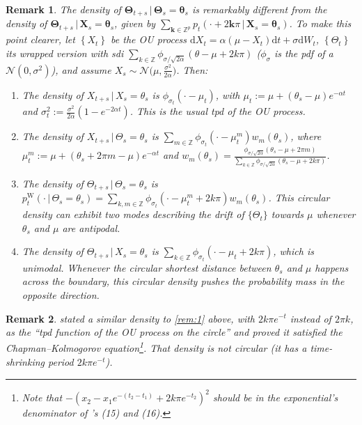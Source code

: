 \documentclass[oneside,11pt]{article}
\newcommand{\Z}{\mathbb{Z}}
\newcommand{\rd}{\mathrm{d}}
\newcommand{\bX}{\mathbf{X}}
\newcommand{\bk}{\mathbf{k}}
\newcommand{\btheta}{\boldsymbol\theta}
\newcommand{\bTheta}{\boldsymbol\Theta}
\newcommand{\lrp}[1]{\left(#1\right)}
\newcommand{\lrb}[1]{\left\{#1\right\}}
\newtheorem{rem}{Remark}
\begin{document}
\begin{rem}
The density of $\bTheta_{t+s}\,|\,\bTheta_s=\btheta_s$ is remarkably different from the density of $\bTheta_{t+s}\,|\,\bX_s=\btheta_s$, given by $\sum_{\bk\in\Z^p}p_t(\cdot+2\bk\pi\,|\, \bX_s=\btheta_s)$. To make this point clearer, let $\lrb{X_t}$ be the OU process $\rd X_t=\alpha(\mu-X_t)\rd t+\sigma\rd W_t$, $\lrb{\Theta_t}$ its wrapped version with sdi $\sum_{k\in\Z}
\phi_{\sigma/\sqrt{2\alpha}}(\theta\allowbreak -\mu+2k\pi)$ ($\phi_\sigma$ is the pdf of a $\mathcal{N}(0,\sigma^2)$), and assume $X_s\sim\mathcal{N}\big(\mu,\frac{\sigma^2}{2\alpha}\big)$. Then:
\begin{enumerate}[label=\roman*., ref=\roman*]
\item The density of $X_{t+s}\,|\,X_s=\theta_s$ is $\phi_{\sigma_t}(\cdot-\mu_t)$, with $\mu_t:=\mu+(\theta_s-\mu)e^{-\alpha t}$ and $\sigma_t^2:=\frac{\sigma^2}{2\alpha}(1-e^{-2\alpha t})$. This is the usual tpd of the OU process.
\item The density of $X_{t+s}\,|\,\Theta_s=\theta_s$ is $\sum_{m\in\Z}\phi_{\sigma_t}(\cdot-\mu_t^m)\allowbreak w_m(\theta_s)$, where $\mu^m_t := \mu + (\theta_s + 2\pi m - \mu)e^{-\alpha t}$ and $w_m(\theta_s) = \frac{\phi_{\sigma/\sqrt{2\alpha}}(\theta_s-\mu+2\pi m)}{\sum_{k\in\Z} \phi_{\sigma/\sqrt{2\alpha}}(\theta_s-\mu+2k\pi)}$.
\item The density of $\Theta_{t+s}\,|\,\Theta_s=\theta_s$ is $p_t^{\mathrm{W}}(\cdot\,|\, \Theta_s=\theta_s)=\sum_{k,m\in\Z} \phi_{\sigma_t} \lrp{\cdot - \mu^m_t  + 2k\pi }w_m(\theta_s)$. This circular density can exhibit two modes describing the drift of $\{\Theta_t\}$ towards $\mu$ whenever $\theta_s$ and $\mu$ are antipodal.
\item The density of $\Theta_{t+s}\,|\,X_s=\theta_s$ is $\sum_{k\in\Z} \phi_{\sigma_t} (\cdot - \mu_t  +\allowbreak 2k\pi)$, which is unimodal. Whenever the circular shortest distance between $\theta_s$ and $\mu$ happens across the boundary, this circular density pushes the probability mass in the opposite direction. \label{rem:1}
\end{enumerate}
\end{rem}

\begin{rem}
\cite{Liu2013} stated a similar density to \ref{rem:1} above, with $2k\pi e^{-t}$ instead of $2\pi k$, as the ``tpd function of the OU process on the circle'' and proved it satisfied the Chapman--Kolmogorov equation\footnote{Note that $-(x_2-x_1e^{-(t_2-t_1)}+2k\pi e^{-t_2})^2$ should be in the exponential's denominator of \cite{Liu2013}'s (15) and \nolinebreak[4](16).}. That density is not circular (it has a time-shrinking period $2k\pi e^{-t}$).
\end{rem}
\end{document}
